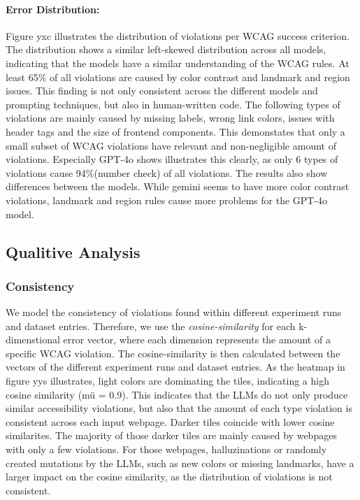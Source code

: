 \paragraph{Error Distribution:}
Figure yxc illustrates the distribution of violations per WCAG success criterion.
The distribution shows a similar left-skewed distribution across all models, indicating 
that the models have a similar understanding of the WCAG rules.\newline
At least 65\% of all violations are caused by color contrast and 
landmark and region issues. This finding is not only consistent across the different models
and prompting techniques, but also in human-written code.
\newline
The following types of violations are mainly caused by missing labels, wrong link colors, 
issues with header tags and the size of frontend components. This demonstates that only 
a small subset of WCAG violations have relevant and non-negligible amount of violations. 
Especially GPT-4o shows illustrates this clearly, as only 6 types of violations cause 
94\%(number check) of all violations.\newline
The results also show differences between the models. While gemini seems to have more color 
contrast violations, landmark and region rules cause
more problems for the GPT-4o model.


\subsection{Qualitive Analysis}
\subsubsection{Consistency}
We model the consistency of violations found within different 
experiment runs and dataset entries. Therefore, we use the \textit{cosine-similarity} for 
each k-dimenstional error vector, where each dimension represents the amount of a specific 
WCAG violation. The cosine-similarity is then calculated between the vectors of the 
different experiment runs and dataset entries. As the heatmap in figure yys illustrates,
light colors are dominating the tiles, indicating a high cosine similarity (mü = 0.9). This 
indicates that the LLMs do not only produce similar accessibility violations, but also that 
the amount of each type violation is consistent across each input webpage. Darker tiles 
coincide with lower cosine similarites. The majority of those darker tiles are mainly caused 
by webpages with only a few violations. For those webpages, halluzinations or randomly 
created mutations by the LLMs, such 
as new colors or missing landmarks, have a larger impact on the cosine similarity, as 
the distribution of violations is not consistent. 

